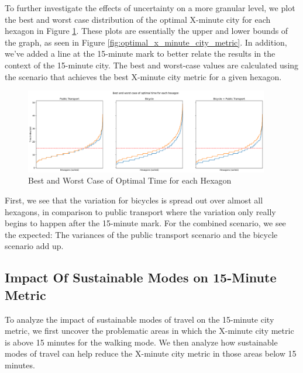 To further investigate the effects of uncertainty on a more granular level, we plot the best and worst case distribution of the optimal X-minute city for each hexagon in Figure \ref{fig:best_and_worst_case_of_optimal_time_for_each_hexagon}.
These plots are essentially the upper and lower bounds of the graph, as seen in Figure \ref{fig:optimal_x_minute_city_metric}.
In addition, we've added a line at the 15-minute mark to better relate the results in the context of the 15-minute city.
The best and worst-case values are calculated using the scenario that achieves the best X-minute city metric for a given hexagon.
\begin{figure}
  \begin{center}
    \includegraphics[width=0.95\textwidth]{Figures/results/uncertainty/optimal_best_worst_case}
  \end{center}
  \caption{Best and Worst Case of Optimal Time for each Hexagon}
  \label{fig:best_and_worst_case_of_optimal_time_for_each_hexagon}
\end{figure}
First, we see that the variation for bicycles is spread out over almost all hexagons, in comparison to public transport where the variation only really begins to happen after the 15-minute mark.
For the combined scenario, we see the expected: The variances of the public transport scenario and the bicycle scenario add up.

\subsection{Impact Of Sustainable Modes on 15-Minute Metric}
\label{subsec:impact_of_sustainable_modes_on_15_minute_metric}

To analyze the impact of sustainable modes of travel on the 15-minute city metric, we first uncover the problematic areas in which the X-minute city metric is above 15 minutes for the walking mode.
We then analyze how sustainable modes of travel can help reduce the X-minute city metric in those areas below 15 minutes.

